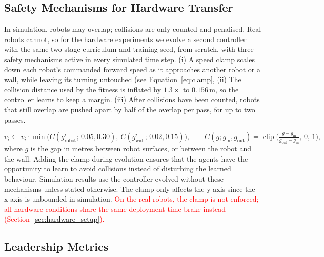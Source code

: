 \documentclass[runningheads]{llncs}
\newcommand{\rev}[1]{\textcolor{red}{#1}}
\begin{document}
\subsection{Safety Mechanisms for Hardware Transfer}
\label{sec:safety}

In simulation, robots may overlap; collisions are only counted and penalised. Real robots cannot, so for the hardware experiments we evolve a second controller with the same two-stage curriculum and training seed, from scratch, with three safety mechanisms active in every simulated time step. (i) A speed clamp scales down each robot's commanded forward speed as it approaches another robot or a wall, while leaving its turning untouched (see Equation~\ref{eq:clamp}, (ii) The collision distance used by the fitness is inflated by $1.3\times$ to $0.156$\,m, so the controller learns to keep a margin. (iii) After collisions have been counted, robots that still overlap are pushed apart by half of the overlap per pass, for up to two passes. 

\begin{equation}
v_i \leftarrow v_i \cdot \min\!\big(C(g^i_{\text{robot}};\,0.05, 0.30),\ C(g^i_{\text{wall}};\,0.02, 0.15)\big),
\qquad
C(g; g_{\text{in}}, g_{\text{out}}) = \operatorname{clip}\!\Big(\tfrac{g - g_{\text{in}}}{g_{\text{out}} - g_{\text{in}}},\,0,\,1\Big),
\label{eq:clamp}
\end{equation}
where $g$ is the gap in metres between robot surfaces, or between the robot and the wall. Adding the clamp during evolution ensures that the agents have the opportunity to learn to avoid collisions instead of disturbing the learned behaviour. Simulation results use the controller evolved without these mechanisms unless stated otherwise. The clamp only affects the y-axis since the x-axis is unbounded in simulation. \rev{On the real robots, the clamp is not enforced; all hardware conditions share the same deployment-time brake instead (Section~\ref{sec:hardware_setup}).}


\subsection{Leadership Metrics}
\label{sec:metrics}
\end{document}
